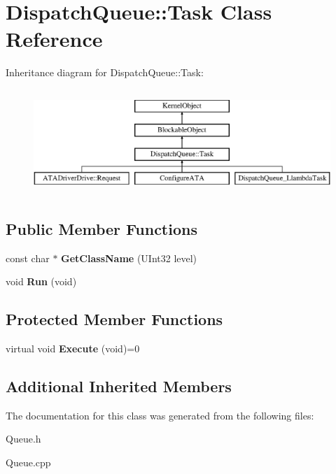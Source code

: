 \hypertarget{class_dispatch_queue_1_1_task}{}\section{Dispatch\+Queue\+:\+:Task Class Reference}
\label{class_dispatch_queue_1_1_task}
Inheritance diagram for Dispatch\+Queue\+:\+:Task\+:\begin{figure}[H]
\begin{center}
\leavevmode
\includegraphics[height=3.992870cm]{class_dispatch_queue_1_1_task}
\end{center}
\end{figure}
\subsection*{Public Member Functions}
\begin{DoxyCompactItemize}
\item 
\mbox{\label{class_dispatch_queue_1_1_task_a94e76bf012724a2bf93a5d4015210093}} 
const char $\ast$ {\bfseries Get\+Class\+Name} (U\+Int32 level)
\item 
\mbox{\label{class_dispatch_queue_1_1_task_aacfac5f9224d54864450f6d84eba6f09}} 
void {\bfseries Run} (void)
\end{DoxyCompactItemize}
\subsection*{Protected Member Functions}
\begin{DoxyCompactItemize}
\item 
\mbox{\label{class_dispatch_queue_1_1_task_aebc5f1e4bc95ebf72677daaac5806864}} 
virtual void {\bfseries Execute} (void)=0
\end{DoxyCompactItemize}
\subsection*{Additional Inherited Members}


The documentation for this class was generated from the following files\+:\begin{DoxyCompactItemize}
\item 
Queue.\+h\item 
Queue.\+cpp\end{DoxyCompactItemize}
